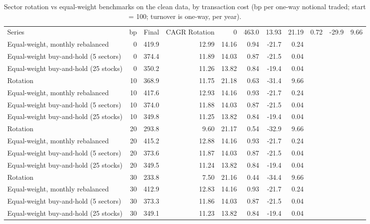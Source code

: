 \begin{table}[ht]
\centering
\small
\caption{Sector rotation vs equal-weight benchmarks on the clean data, by transaction cost (bp per one-way notional traded; start = 100; turnover is one-way, per year).}
\label{tab:backtest-costs}
\begin{tabular}{lrrrrrrr}
\toprule
Series & bp & Final & CAGR %
\midrule
Rotation & 0 & 463.0 & 13.93 & 21.19 & 0.72 & -29.9 & 9.66 \\
Equal-weight, monthly rebalanced & 0 & 419.9 & 12.99 & 14.16 & 0.94 & -21.7 & 0.24 \\
Equal-weight buy-and-hold (5 sectors) & 0 & 374.4 & 11.89 & 14.03 & 0.87 & -21.5 & 0.04 \\
Equal-weight buy-and-hold (25 stocks) & 0 & 350.2 & 11.26 & 13.82 & 0.84 & -19.4 & 0.04 \\
Rotation & 10 & 368.9 & 11.75 & 21.18 & 0.63 & -31.4 & 9.66 \\
Equal-weight, monthly rebalanced & 10 & 417.6 & 12.93 & 14.16 & 0.93 & -21.7 & 0.24 \\
Equal-weight buy-and-hold (5 sectors) & 10 & 374.0 & 11.88 & 14.03 & 0.87 & -21.5 & 0.04 \\
Equal-weight buy-and-hold (25 stocks) & 10 & 349.8 & 11.25 & 13.82 & 0.84 & -19.4 & 0.04 \\
Rotation & 20 & 293.8 & 9.60 & 21.17 & 0.54 & -32.9 & 9.66 \\
Equal-weight, monthly rebalanced & 20 & 415.2 & 12.88 & 14.16 & 0.93 & -21.7 & 0.24 \\
Equal-weight buy-and-hold (5 sectors) & 20 & 373.6 & 11.87 & 14.03 & 0.87 & -21.5 & 0.04 \\
Equal-weight buy-and-hold (25 stocks) & 20 & 349.5 & 11.24 & 13.82 & 0.84 & -19.4 & 0.04 \\
Rotation & 30 & 233.8 & 7.50 & 21.16 & 0.44 & -34.4 & 9.66 \\
Equal-weight, monthly rebalanced & 30 & 412.9 & 12.83 & 14.16 & 0.93 & -21.7 & 0.24 \\
Equal-weight buy-and-hold (5 sectors) & 30 & 373.3 & 11.86 & 14.03 & 0.87 & -21.5 & 0.04 \\
Equal-weight buy-and-hold (25 stocks) & 30 & 349.1 & 11.23 & 13.82 & 0.84 & -19.4 & 0.04 \\
\bottomrule
\end{tabular}
\end{table}
